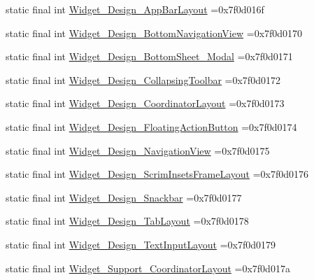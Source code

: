 \begin{DoxyCompactItemize}
\item 
static final int \mbox{\hyperlink{classcom_1_1example_1_1trainawearapplication_1_1_r_1_1style_a7ed25579181ee59a96130a1293eb715e}{Widget\+\_\+\+Design\+\_\+\+App\+Bar\+Layout}} =0x7f0d016f
\item 
static final int \mbox{\hyperlink{classcom_1_1example_1_1trainawearapplication_1_1_r_1_1style_a21366d4fd91e5c98448c93b29370a272}{Widget\+\_\+\+Design\+\_\+\+Bottom\+Navigation\+View}} =0x7f0d0170
\item 
static final int \mbox{\hyperlink{classcom_1_1example_1_1trainawearapplication_1_1_r_1_1style_a2783447154907652f57b95c8eefc8e09}{Widget\+\_\+\+Design\+\_\+\+Bottom\+Sheet\+\_\+\+Modal}} =0x7f0d0171
\item 
static final int \mbox{\hyperlink{classcom_1_1example_1_1trainawearapplication_1_1_r_1_1style_a7ac97bd00b8ebf8599fdecd4fb4402fb}{Widget\+\_\+\+Design\+\_\+\+Collapsing\+Toolbar}} =0x7f0d0172
\item 
static final int \mbox{\hyperlink{classcom_1_1example_1_1trainawearapplication_1_1_r_1_1style_a95831115c75718dac6f38cbb1582d5d4}{Widget\+\_\+\+Design\+\_\+\+Coordinator\+Layout}} =0x7f0d0173
\item 
static final int \mbox{\hyperlink{classcom_1_1example_1_1trainawearapplication_1_1_r_1_1style_ad84343c7fe6080afa14e1f2b40f1a3a7}{Widget\+\_\+\+Design\+\_\+\+Floating\+Action\+Button}} =0x7f0d0174
\item 
static final int \mbox{\hyperlink{classcom_1_1example_1_1trainawearapplication_1_1_r_1_1style_a6635c607f34e9d091e0afc7235fdff96}{Widget\+\_\+\+Design\+\_\+\+Navigation\+View}} =0x7f0d0175
\item 
static final int \mbox{\hyperlink{classcom_1_1example_1_1trainawearapplication_1_1_r_1_1style_a9e6a9b427d9acdb7202109f65d014cac}{Widget\+\_\+\+Design\+\_\+\+Scrim\+Insets\+Frame\+Layout}} =0x7f0d0176
\item 
static final int \mbox{\hyperlink{classcom_1_1example_1_1trainawearapplication_1_1_r_1_1style_ad908427ec0c3f3cb16f66bc1afd986b7}{Widget\+\_\+\+Design\+\_\+\+Snackbar}} =0x7f0d0177
\item 
static final int \mbox{\hyperlink{classcom_1_1example_1_1trainawearapplication_1_1_r_1_1style_acf2397765a99a21b4c5414d282a27107}{Widget\+\_\+\+Design\+\_\+\+Tab\+Layout}} =0x7f0d0178
\item 
static final int \mbox{\hyperlink{classcom_1_1example_1_1trainawearapplication_1_1_r_1_1style_af689f08ad5261d44b3dc65bf6917addc}{Widget\+\_\+\+Design\+\_\+\+Text\+Input\+Layout}} =0x7f0d0179
\item 
static final int \mbox{\hyperlink{classcom_1_1example_1_1trainawearapplication_1_1_r_1_1style_a5e83fcc6709baf9bc3be5c255fa88b6f}{Widget\+\_\+\+Support\+\_\+\+Coordinator\+Layout}} =0x7f0d017a
\end{DoxyCompactItemize}


